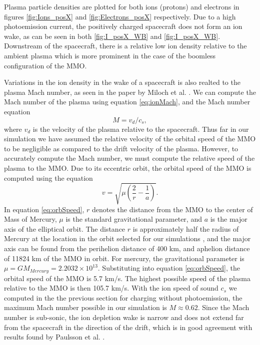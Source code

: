 Plasma particle densities are plotted for both ions (protons) and electrons in figures \ref{fig:Ions_posX} and \ref{fig:Electrons_posX} respectively. Due to a high photoemission current, the positively charged spacecraft does not form an ion wake, as can be seen in both \ref{fig:I_posX_WB} and \ref{fig:I_posX_WB}. Downstream of the spacecraft, there is a relative low ion density relative to the ambient plasma which is more prominent in the case of the boomless configuration of the MMO. 

Variations in the ion density in the wake of a spacecraft is also realted to the plasma Mach number, as seen in the paper by Miloch et al. . We can compute the Mach number of the plasma using equation \eqref{eq:ionMach}, and the Mach number equation
\begin{equation}
    M = v_d / c_s,
\end{equation}
where $v_d$ is the velocity of the plasma relative to the spacecraft. Thus far in our simulation we have assumed the relative velocity of the orbital speed of the MMO to be negligible as compared to the drift velocity of the plasma. However, to accurately compute the Mach number, we must compute the relative speed of the plasma to the MMO. Due to its eccentric orbit, the orbital speed of the MMO is computed using the equation
\begin{equation}\label{eq:orbSpeed}
    v = \sqrt{\mu \left(\frac{2}{r} - \frac{1}{a}\right)}.
\end{equation}
In equation \eqref{eq:orbSpeed}, $r$ denotes the distance from the MMO to the center of Mass of Mercury, $\mu$ is the standard gravitational parameter, and $a$ is the major axis of the elliptical orbit. The distance $r$ is approximately half the radius of Mercury at the location in the orbit selected for our simulations \parencite{Benna2009}, and the major axis can be found from the perihelion distance of 400 km, and aphelion distance of 11824 km of the MMO in orbit. For mercury, the gravitational parameter is $\mu = G M_{Mercury} = 2.2032 \times 10^{13}$. Substituting into equation \eqref{eq:orbSpeed}, the orbital speed of the MMO is 5.7 km/s. The highest possible speed of the plasma relative to the MMO is then 105.7 km/s. With the ion speed of sound $c_s$ we computed in the the previous section for charging without photoemission, the maximum Mach number possible in our simulation is $M \approx 0.62$. Since the Mach number is sub-sonic, the ion depletion wake is narrow and does not extend far from the spacecraft in the direction of the drift, which is in good agreement with results found by Paulsson et al. \parencite{Paulsson2019}.   


